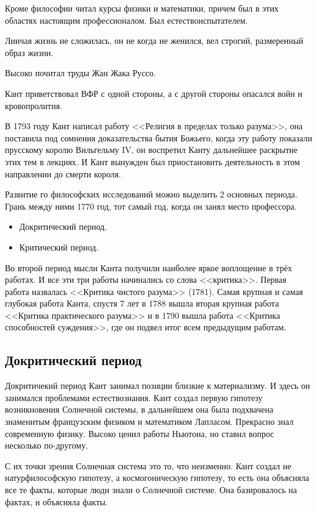     Кроме философии читал курсы физики и математики, причем был в этих областях настоящим профессионалом. Был естествоиспытателем.

Линчая жизнь не сложилась, он не когда не женился, вел строгий, размеренный образ жизни.

Высоко почитал труды Жан Жака Руссо.

    Кант приветствовал ВФР с одной стороны, а с другой стороны опасался войн и кровопролития.

В 1793 году Кант написал работу <<Религия в пределах только разума>>, она поставила под сомнения доказательства бытия Божьего, когда эту работу показали прусскому королю Вильгельму IV, он воспретил Канту дальнейшее раскрытие этих тем в лекциях. И Кант вынужден был приостановить деятельность в этом направлении до смерти короля.

Развитие го философских исследований можно выделить 2 основных периода. Грань между ними 1770 год, тот самый год, когда он занял место профессора.

\begin{itemize}
    \item Докритический период.
    \item Критический период.
\end{itemize}

Во второй период мысли Канта получили наиболее яркое воплощение в трёх работах. И все эти три работы начинались со слова <<критика>>. Первая работа назвалась <<Критика чистого разума>> (1781). Самая крупная и самая глубокая работа Канта, спустя 7 лет в 1788 вышла вторая крупная работа <<Критика практического разума>> и в 1790 вышла работа <<Критика способностей суждения>>, где он подвел итог всем предыдущим работам.
\subsection{Докритический период}

Докритичекий период Кант занимал позиции близкие к материализму. И здесь он занимался проблемами естествознания. Кант создал первую гипотезу возникновения Солнечной системы, в дальнейшем она была подхвачена знаменитым французским физиком и математиком Лапласом. Прекрасно знал современную физику. Высоко ценил работы Ньютона, но ставил вопрос несколько по-другому.

    С их точки зрения Солнечная система это то, что неизменно. Кант создал не натурфилософскую гипотезу, а космогоническую гипотезу, то есть она объясняла все те факты, которые люди знали о Солнечной системе. Она базировалось на фактах, и объясняла факты.

